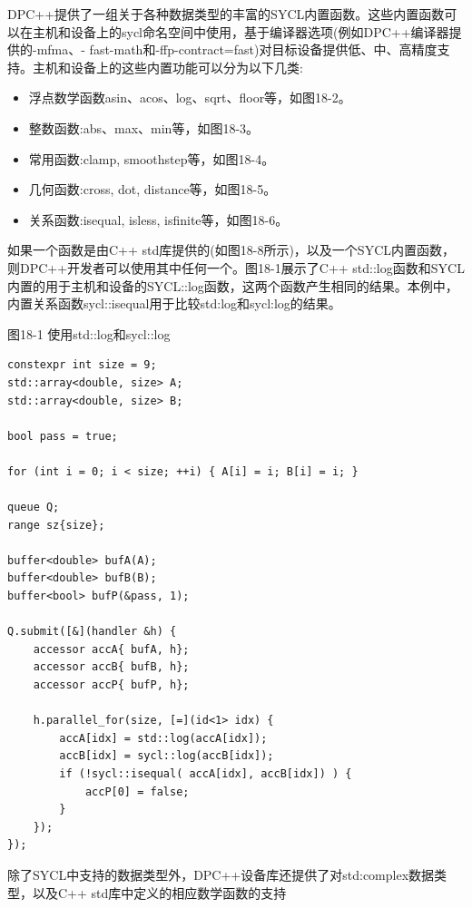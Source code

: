 DPC++提供了一组关于各种数据类型的丰富的SYCL内置函数。这些内置函数可以在主机和设备上的sycl命名空间中使用，基于编译器选项(例如DPC++编译器提供的-mfma、- fast-math和-ffp-contract=fast)对目标设备提供低、中、高精度支持。主机和设备上的这些内置功能可以分为以下几类:\par

\begin{itemize}
	\item 浮点数学函数asin、acos、log、sqrt、floor等，如图18-2。
	\item 整数函数:abs、max、min等，如图18-3。
	\item 常用函数:clamp, smoothstep等，如图18-4。
	\item 几何函数:cross, dot, distance等，如图18-5。
	\item 关系函数:isequal, isless, isfinite等，如图18-6。
\end{itemize}

如果一个函数是由C++ std库提供的(如图18-8所示)，以及一个SYCL内置函数，则DPC++开发者可以使用其中任何一个。图18-1展示了C++ std::log函数和SYCL内置的用于主机和设备的SYCL::log函数，这两个函数产生相同的结果。本例中，内置关系函数sycl::isequal用于比较std:log和sycl:log的结果。\par

\hspace*{\fill} \par %
图18-1 使用std::log和sycl::log
\begin{lstlisting}[caption={}]
constexpr int size = 9;
std::array<double, size> A;
std::array<double, size> B;

bool pass = true;

for (int i = 0; i < size; ++i) { A[i] = i; B[i] = i; }

queue Q;
range sz{size};

buffer<double> bufA(A);
buffer<double> bufB(B);
buffer<bool> bufP(&pass, 1);

Q.submit([&](handler &h) {
	accessor accA{ bufA, h};
	accessor accB{ bufB, h};
	accessor accP{ bufP, h};
	
	h.parallel_for(size, [=](id<1> idx) {
		accA[idx] = std::log(accA[idx]);
		accB[idx] = sycl::log(accB[idx]);
		if (!sycl::isequal( accA[idx], accB[idx]) ) {
			accP[0] = false;
		}
	});
});
\end{lstlisting}

除了SYCL中支持的数据类型外，DPC++设备库还提供了对std:complex数据类型，以及C++ std库中定义的相应数学函数的支持\par


